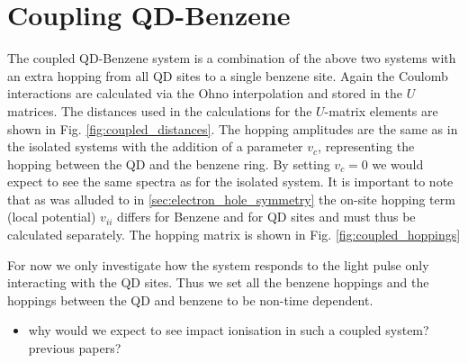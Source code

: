\section{Coupling QD-Benzene}
    The coupled QD-Benzene system is a combination of the above two systems with an extra hopping from all QD sites to a single benzene site. Again the Coulomb interactions are calculated via the Ohno interpolation and stored in the $U$ matrices. The distances used in the calculations for the $U$-matrix elements are shown in Fig. \ref{fig:coupled_distances}. The hopping amplitudes are the same as in the isolated systems with the addition of a parameter $v_c$, representing the hopping between the QD and the benzene ring. By setting $v_c = 0$ we would expect to see the same spectra as for the isolated system. It is important to note that as was alluded to in \ref{sec:electron_hole_symmetry} the on-site hopping term (local potential) $v_{ii}$ differs for Benzene and for QD sites and must thus be calculated separately. The hopping matrix is shown in Fig. \ref{fig:coupled_hoppings}
    \medskip
    
    For now we only investigate how the system responds to the light pulse only interacting with the QD sites. Thus we set all the benzene hoppings and the hoppings between the QD and benzene to be non-time dependent.

\begin{itemize}
    \item {\color{red} why would we expect to see impact ionisation in such a coupled system? previous papers?}
\end{itemize}

\usetikzlibrary{matrix, positioning}

\newcommand{\my}{|[fill=myellow]|}
\renewcommand{\mg}{|[fill=mgreen]|}



